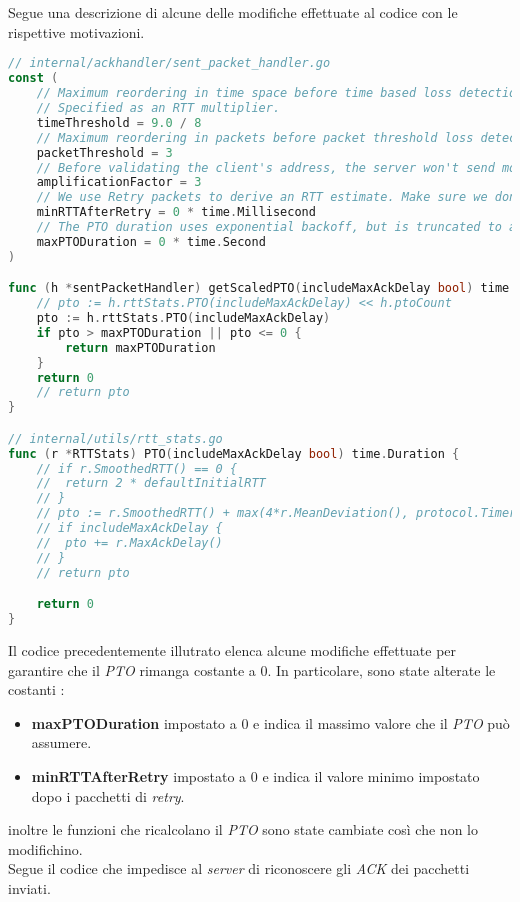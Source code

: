 \\\\
Segue una descrizione di alcune delle modifiche effettuate al codice con le rispettive motivazioni.
\begin{lstlisting}[language=Go]
// internal/ackhandler/sent_packet_handler.go
const (
	// Maximum reordering in time space before time based loss detection considers a packet lost.
	// Specified as an RTT multiplier.
	timeThreshold = 9.0 / 8
	// Maximum reordering in packets before packet threshold loss detection considers a packet lost.
	packetThreshold = 3
	// Before validating the client's address, the server won't send more than 3x bytes than it received.
	amplificationFactor = 3
	// We use Retry packets to derive an RTT estimate. Make sure we don't set the RTT to a super low value yet.
	minRTTAfterRetry = 0 * time.Millisecond 
	// The PTO duration uses exponential backoff, but is truncated to a maximum value, as allowed by RFC 8961, section 4.4.
	maxPTODuration = 0 * time.Second 
)

func (h *sentPacketHandler) getScaledPTO(includeMaxAckDelay bool) time.Duration {
	// pto := h.rttStats.PTO(includeMaxAckDelay) << h.ptoCount
	pto := h.rttStats.PTO(includeMaxAckDelay)
	if pto > maxPTODuration || pto <= 0 {
		return maxPTODuration
	}
	return 0
	// return pto
}

// internal/utils/rtt_stats.go
func (r *RTTStats) PTO(includeMaxAckDelay bool) time.Duration {
	// if r.SmoothedRTT() == 0 {
	// 	return 2 * defaultInitialRTT
	// }
	// pto := r.SmoothedRTT() + max(4*r.MeanDeviation(), protocol.TimerGranularity)
	// if includeMaxAckDelay {
	// 	pto += r.MaxAckDelay()
	// }
	// return pto

	return 0
}
\end{lstlisting}
\noindent Il codice precedentemente illutrato elenca alcune modifiche effettuate per garantire che il \emph{PTO} rimanga costante a 0. 
In particolare, sono state alterate le costanti : 
\begin{itemize}
    \item \textbf{maxPTODuration} impostato a 0 e indica il massimo valore che il \emph{PTO} può assumere. 
    \item \textbf{minRTTAfterRetry} impostato a 0 e indica il valore minimo impostato dopo i pacchetti di \emph{retry}.
\end{itemize}
\noindent inoltre le funzioni che ricalcolano il \emph{PTO} sono state cambiate così che non lo modifichino.
\\
Segue il codice che impedisce al \emph{server} di riconoscere gli \emph{ACK} dei pacchetti inviati. 
